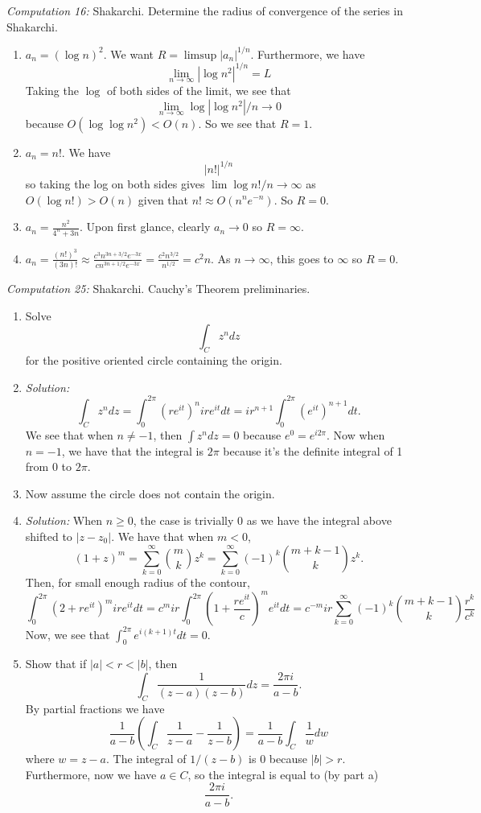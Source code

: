 \documentclass{article}
\newcommand{\comp}[2]{
\vspace{0.2in}\begin{mdframed}[
  backgroundcolor=problem,
  skipabove=\topsep,
  skipbelow=\topsep
  ]
  \emph{Computation {#1}:} {#2}
\end{mdframed}}
\begin{document}
    \comp{16}{Shakarchi. Determine the radius of convergence of the series in Shakarchi.}
    \begin{enumerate}
      \item $a_n=(\log{n})^2$. We want $R = \limsup|a_n|^{1/n}$. Furthermore, we have 
      \[\lim_{n\to\infty} |\log{n}^2|^{1/n} = L\]
      Taking the $\log$ of both sides of the limit, we see that 
      \[\lim_{n\to\infty} \log{|\log{n}^2|}/n \to 0\]
      because $O(\log{\log{n}^2}) < O(n)$. So we see that $R = 1$.
      \item $a_n=n!$. We have 
      \[|n!|^{1/n}\]
      so taking the log on both sides gives
      $\lim \log{n!}/n \to \infty$ as $O(\log{n!}) > O(n)$ given that $n!\approx O(n^ne^{-n})$. So $R = 0$.
      \item $a_n = \frac{n^2}{4^n+3n}$. Upon first glance, clearly $a_n\to 0$ so $R=\infty$.
      \item $a_n = \frac{(n!)^3}{(3n)!} \approx \frac{c^3n^{3n+3/2}e^{-3x}}{cn^{3n+1/2}e^{-3x}} = \frac{c^2n^{3/2}}{n^{1/2}} = c^2n$. As $n\to\infty$, this goes to $\infty$ so $R=0$.
    \end{enumerate}
    \comp{25}{Shakarchi. Cauchy's Theorem preliminaries.}
    \begin{enumerate}
      \item Solve 
      \[\int_C z^ndz\]
      for the positive oriented circle containing the origin.
      \item[] \textit{Solution:} 
      \[\int_C z^ndz = \int_0^{2\pi}(re^{it})^nire^{it}dt = ir^{n+1}\int_0^{2\pi}(e^{it})^{n+1}dt.\]
      We see that when $n \ne -1$, then $\int z^ndz = 0$ because  $e^{0} = e^{i2\pi}$. Now when $n=-1$, we have that
      the integral is $2\pi$ because it's the definite integral of 1 from $0$ to $2\pi$.
      \item Now assume the circle does not contain the origin.
      \item[] \textit{Solution:}
      When $n \ge 0$, the case is trivially $0$ as we have the integral above shifted to $|z-z_0|$. We have that when $m < 0$,
      \[(1+z)^m = \sum_{k=0}^\infty\binom{m}{k}z^k = \sum_{k=0}^\infty (-1)^k\binom{m+k-1}{k}z^k.\]
      Then, for small enough radius of the contour,
      \[\int_0^{2\pi}(2+re^{it})^{m}ire^{it}dt = c^{m}ir\int_0^{2\pi}\left(1+\frac{re^{it}}{c}\right)^me^{it}dt = c^{-m}ir\sum_{k=0}^\infty (-1)^k\binom{m+k-1}{k}\frac{r^k}{c^k}\]
      Now, we see that $\int_0^{2\pi}e^{i(k+1)t}dt = 0$.
      \item Show that if $|a| < r < |b|$, then 
      \[\int_C \frac{1}{(z-a)(z-b)}dz = \frac{2\pi i}{a-b}.\]
      By partial fractions we have
      \[\frac{1}{a-b}\left(\int_C \frac{1}{z-a} - \frac{1}{z-b}\right) = \frac{1}{a-b}\int_C\frac{1}{w}dw\]
      where $w = z-a$. The integral of $1/(z-b)$ is 0 because $|b| > r$. Furthermore, now we have $a\in C$, so the integral is equal to (by part a)
      \[ \frac{2\pi i}{a-b}.\]


    \end{enumerate}
\end{document}
